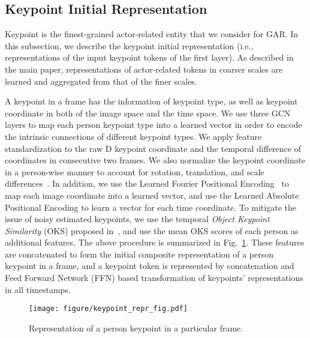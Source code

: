 \documentclass[runningheads]{llncs}
\begin{document}
\subsection{Keypoint Initial Representation} 
\label{subsec:entity_repre}



Keypoint is the finest-grained actor-related entity that we consider for GAR. In this subsection, we describe the keypoint initial representation (i.e., representations of the input keypoint tokens of the first \mtx layer). 
As described in the main paper, representations of actor-related tokens in coarser scales are learned and aggregated from that of the finer scales.

 
 
A keypoint in a frame has the information of  keypoint type, as well as keypoint coordinate in both of the image space and the time space.
We use three GCN~\cite{kipf2016semi} layers to map each person keypoint type into a learned vector in order to encode the intrinsic connections of different keypoint types. 
We apply feature standardization 
to the raw D keypoint coordinate and the 
temporal 
difference of coordinates in consecutive two frames.
We also
normalize the keypoint coordinate in a person-wise manner to account for rotation, translation, and scale differences~\cite{zappardino2021learning,sun2020view}. 
In addition, we use the Learned Fourier Positional Encoding~\cite{tancik2020fourier} to map each image coordinate into a learned vector, and use the Learned Absolute Positional Encoding to learn a vector for each time coordinate. 
To mitigate the issue of noisy estimated keypoints, we use the temporal
\textit{Object Keypoint Similarity} (OKS) proposed in~\cite{snower202015}, 
and use the mean  
OKS scores of each person as additional 
features. 
The above procedure 
is summarized in Fig.~\ref{fig:keypoint_repr}.
These features are concatenated to form the initial composite representation of a person keypoint 
in a  
frame, and a keypoint token is represented by concatenation and Feed Forward Network (FFN) based transformation of keypoints' representations in all timestamps.

  
 
 

\begin{figure}[t]
	\centering
	\texttt{[image: figure/keypoint\_repr\_fig.pdf]}
	\caption{
	Representation of a person keypoint 
	in a particular frame.
}
	\label{fig:keypoint_repr} 
\end{figure}
 
\end{document}
